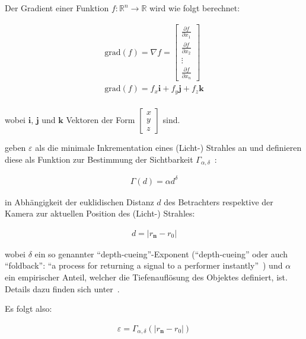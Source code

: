 Der Gradient einer Funktion $f: \mathbb{R}^{n} \to \mathbb{R}$ wird wie
folgt berechnet:

\begin{gather}
    \text{grad}(f) = \nabla f = \begin{bmatrix}
        \frac{\partial f}{\partial x_{1}} \\
        \frac{\partial f}{\partial x_{2}} \\
        \vdots \\
        \frac{\partial f}{\partial x_{n}} 
    \end{bmatrix}\\
    \text{grad}(f) = f_{x}\bm{i} + f_{y}\bm{j} + f_{z}\bm{k}\\
\end{gather}

wobei $\bm{i}$, $\bm{j}$ und $\bm{k}$ Vektoren der Form $\begin{bmatrix}
    x \\ y \\ z \end{bmatrix}$ sind.

\citeauthor{hart_ray_1989} geben $\varepsilon$ als die minimale
Inkrementation eines (Licht-) Strahles an und definieren diese als
Funktion zur Bestimmung der Sichtbarkeit $\Gamma_{\alpha,
    \delta}$~\parencite[S. 293]{hart_ray_1989}:

\begin{gather}
    \Gamma(d) = \alpha d^{\delta}
\end{gather}

in Abhängigkeit der euklidischen Distanz $d$ des Betrachters respektive
der Kamera zur aktuellen Position des (Licht-) Strahles:

\begin{gather}
    d = |r_{\bm{n}} - r_{0}|
\end{gather}

wobei $\delta$ ein so genannter ``depth-cueing''-Exponent
(``depth-cueing'' oder auch ``foldback'': ``a process for returning a
signal to a performer
instantly''~\parencite{liam_collins_sons_&_co._ltd._collins_2015}) und
$\alpha$ ein empirischer Anteil, welcher die Tiefenauflösung des
Objektes definiert, ist.  Details dazu finden sich
unter~\cite[S. 293, Abschnitt 4.2 --- ``Clarity'']{hart_ray_1989}.

Es folgt also:

\begin{gather}
    \varepsilon = \Gamma_{\alpha, \delta}(|r_{\bm{n}} - r_0|)
\end{gather}

